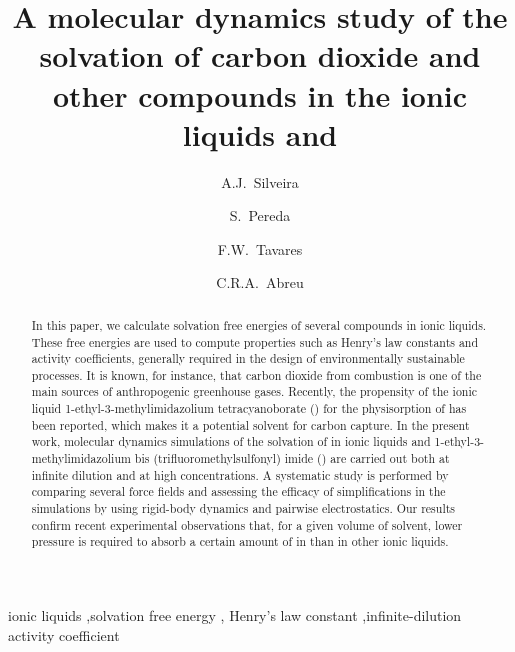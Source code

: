 \documentclass[3p,twocolumn]{elsarticle}
\begin{document}
\begin{frontmatter}

\title{A molecular dynamics study of the solvation of carbon dioxide and other compounds in the ionic liquids \ce{[emim][B(CN)_4]} and \ce{[emim][NTf_2]}}

\author[plapiqui]{A.J.~Silveira}
\author[plapiqui]{S.~Pereda}
\author[eq-ufrj,coppe-ufrj]{F.W.~Tavares}
\author[eq-ufrj]{C.R.A.~Abreu}

\address[plapiqui]{Planta Piloto de Ingenier\'ia Qu\'imica (PLAPIQUI), Universidad Nacional del Sur, Bah\'ia Blanca, Argentina}
\address[eq-ufrj]{Chemical Engineering Department, Escola de Qu\'imica, Universidade Federal do Rio de Janeiro, Rio de Janeiro, Brazil}
\address[coppe-ufrj]{Chemical Engineering Program, Alberto Luiz Coimbra Institute for Graduate Studies and Research in Engineering (COPPE), Universidade Federal do Rio de Janeiro, Rio de Janeiro, Brazil}


\begin{abstract}
In this paper, we calculate solvation free energies of several compounds in ionic liquids.
These free energies are used to compute properties such as Henry's law constants and activity coefficients, generally required in the design of environmentally sustainable processes.
It is known, for instance, that carbon dioxide from combustion is one of the main sources of anthropogenic greenhouse gases.
Recently, the propensity of the ionic liquid 1-ethyl-3-methylimidazolium tetracyanoborate (\ce{[emim][B(CN)_4]}) for the physisorption of  has been reported, which makes it a potential solvent for carbon capture.
In the present work, molecular dynamics simulations of the solvation of  in ionic liquids \ce{[emim][B(CN)_4]} and 1-ethyl-3-methylimidazolium bis (trifluoromethylsulfonyl) imide (\ce{[emim][NTf_2]}) are carried out both at infinite dilution and at high concentrations.
A systematic study is performed by comparing several force fields and assessing the efficacy of simplifications in the simulations by using rigid-body dynamics and pairwise electrostatics.
Our results confirm recent experimental observations that, for a given volume of solvent, lower pressure is required to absorb a certain amount of  in \ce{[emim][B(CN)_4]} than in other ionic liquids.
\end{abstract}

\begin{keyword}
ionic liquids \sep solvation free energy \sep {} Henry's law constant \sep infinite-dilution activity coefficient
\end{keyword}

\end{frontmatter}
\end{document}

